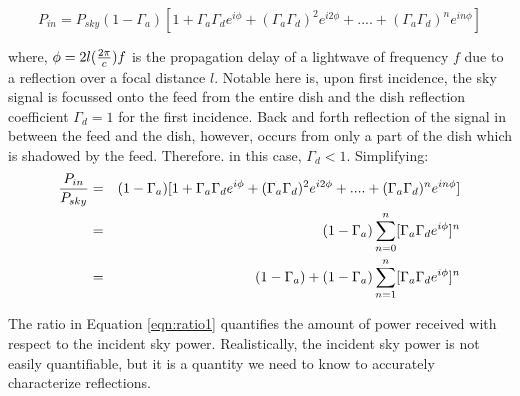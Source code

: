\documentclass[12pt,preprint]{aastex}
\begin{document}
\begin{equation}\label{eqn:series1}
P_{in} =  P_{sky}(1-\Gamma_{a})[1+ \Gamma_{a}\Gamma_{d} e^{i\phi}+ (\Gamma_{a}\Gamma_{d})^2e^{i2\phi}+ ....+ (\Gamma_{a}\Gamma_{d})^{n}e^{in\phi}]
\end{equation}

where, $\phi = 2l({2\pi \over c})f$ is the propagation delay of a lightwave of frequency $f$ due to a reflection over a focal distance $l$. Notable here is, upon first incidence, the sky signal is focussed onto the feed from the entire dish and the dish reflection coefficient $\Gamma_{d}=1$ for the first incidence. Back and forth reflection of the signal in between the feed and the dish, however, occurs from only a part of the dish which is shadowed by the feed. Therefore. in this case, $\Gamma_{d} < 1$.
Simplifying:
\begin{eqnarray}\label{eqn:ratio1}
{P_{in} \over P_{sky} } & = & (1-\Gamma_{a})[1+ \Gamma_{a}\Gamma_{d} e^{i\phi}+ (\Gamma_{a}\Gamma_{d})^2e^{i2\phi}+ ....+ (\Gamma_{a}\Gamma_{d})^{n}e^{in\phi}] \nonumber\\
      & = & (1-\Gamma_{a}) \displaystyle\sum\limits_{n=0}^{n} [\Gamma_{a}\Gamma_{d}e^{i \phi}]^{n}\nonumber\\
      & = & (1-\Gamma_{a})+(1-\Gamma_{a}) \displaystyle\sum\limits_{n=1}^{n} [\Gamma_{a}\Gamma_{d}e^{i \phi}]^{n}
\end{eqnarray}

The ratio in Equation \ref{eqn:ratio1} quantifies the amount of power received
with respect to the incident sky power. Realistically, the incident sky power
is not easily quantifiable, but it is a quantity we need to know to accurately
characterize reflections.  


 
\end{document}
